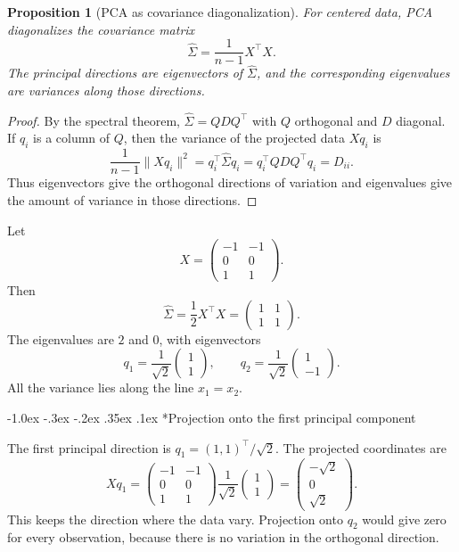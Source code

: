 \documentclass[10pt]{article}
\makeatletter
\renewcommand\subsection{\@startsection{subsection}{2}{\z@}%
  {-1.0ex \@plus -.3ex \@minus -.2ex}%
  {.35ex \@plus .1ex}%
  {\normalfont\normalsize\bfseries}}
\theoremstyle{compactdefinition}
\theoremstyle{compactproposition}
\newtheorem{proposition}{Proposition}[section]
\makeatother
\begin{document}
\begin{proposition}[PCA as covariance diagonalization]
For centered data, PCA diagonalizes the covariance matrix
\[
\widehat{\Sigma}=\frac{1}{n-1}X^\top X.
\]
The principal directions are eigenvectors of $\widehat{\Sigma}$, and the
corresponding eigenvalues are variances along those directions.
\end{proposition}

\begin{proof}
By the spectral theorem, $\widehat{\Sigma}=QDQ^\top$ with $Q$ orthogonal and
$D$ diagonal. If $q_i$ is a column of $Q$, then the variance of the projected
data $Xq_i$ is
\[
\frac{1}{n-1}\|Xq_i\|^2
=q_i^\top\widehat{\Sigma}q_i
=q_i^\top QDQ^\top q_i
=D_{ii}.
\]
Thus eigenvectors give the orthogonal directions of variation and eigenvalues
give the amount of variance in those directions.
\end{proof}

Let
\[
X=
\begin{pmatrix}
-1&-1\\
0&0\\
1&1
\end{pmatrix}.
\]
Then
\[
\widehat{\Sigma}=\frac{1}{2}X^\top X
=
\begin{pmatrix}1&1\\1&1\end{pmatrix}.
\]
The eigenvalues are $2$ and $0$, with eigenvectors
\[
q_1=\frac{1}{\sqrt 2}\begin{pmatrix}1\\1\end{pmatrix},
\qquad
q_2=\frac{1}{\sqrt 2}\begin{pmatrix}1\\-1\end{pmatrix}.
\]
All the variance lies along the line $x_1=x_2$.

\subsection*{Projection onto the first principal component}

The first principal direction is $q_1=(1,1)^\top/\sqrt2$. The projected
coordinates are
\[
Xq_1=
\begin{pmatrix}
-1&-1\\
0&0\\
1&1
\end{pmatrix}
\frac{1}{\sqrt2}
\begin{pmatrix}
1\\1
\end{pmatrix}
=
\begin{pmatrix}
-\sqrt2\\
0\\
\sqrt2
\end{pmatrix}.
\]
This keeps the direction where the data vary. Projection onto $q_2$ would give
zero for every observation, because there is no variation in the orthogonal
direction.
\end{document}
